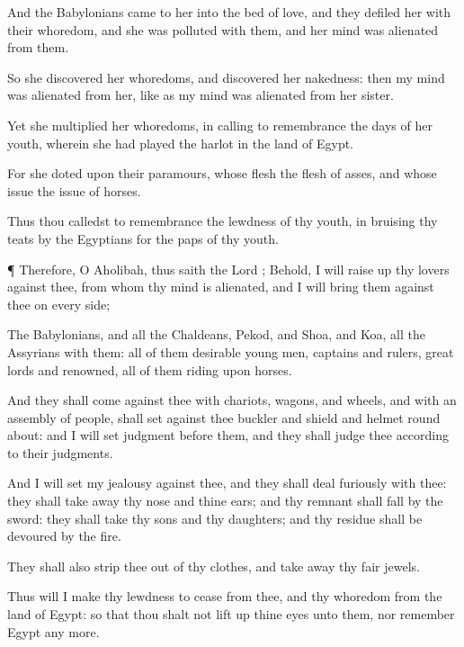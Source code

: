 {And the
Babylonians
came to her into the
bed of
love, and they
defiled her with their
whoredom, and she was
polluted with them, and her
mind was
alienated from them.

So she
discovered her
whoredoms, and
discovered her
nakedness: then my
mind was
alienated from her, like as my
mind was
alienated from her
sister.

Yet she
multiplied her
whoredoms, in calling to
remembrance the
days of her
youth, wherein she had played the
harlot in the
land of
Egypt.

For she
doted upon their
paramours, whose
flesh
{} the
flesh of
asses, and whose
issue
{} the
issue of
horses.

Thus thou calledst to
remembrance the
lewdness of thy
youth, in
bruising thy
teats by the
Egyptians for the
paps of thy
youth.


\par }{\PP {}¶ Therefore, O
Aholibah, thus
saith the
Lord
{}; Behold, I will raise
up thy
lovers against thee, from whom thy
mind is
alienated, and I will
bring them against thee on every
side;

The
Babylonians, and all the
Chaldeans,
Pekod, and
Shoa, and
Koa,
{} all the
Assyrians with them: all of them
desirable young
men,
captains and
rulers, great
lords and
renowned, all of them
riding upon
horses.

And they shall
come against thee with
chariots,
wagons, and
wheels, and with an
assembly of
people,
{} shall
set against thee
buckler and
shield and
helmet round
about: and I will
set
judgment
before them, and they shall
judge thee according to their
judgments.

And I will
set my
jealousy against thee, and they shall
deal
furiously with thee: they shall take
away thy
nose and thine
ears; and thy
remnant shall
fall by the
sword: they shall
take thy
sons and thy
daughters; and thy
residue shall be
devoured by the
fire.

They shall also
strip thee out of thy
clothes, and take
away thy
fair
jewels.

Thus will I make thy
lewdness to
cease from thee, and thy
whoredom
{} from the
land of
Egypt: so that thou shalt not lift
up thine
eyes unto them, nor
remember
Egypt any more.

}
